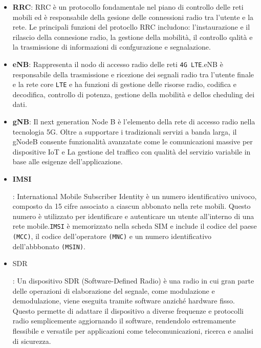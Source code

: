 \documentclass[english]{article}
\begin{document}
\begin{itemize}
	\item \textbf{\hypertarget{RRC}{RRC}}: RRC è un protocollo fondamentale
	      nel piano di controllo delle reti mobili ed è responsabile della gesione delle
	      connessioni radio tra l'utente e la rete. Le principali funzioni
	      del protocllo RRC includono: l'instaurazione e il rilascio della connesione radio,
	      la gestione della mobilità, il controllo qalità  e la trasmissione di informazioni
	      di confgurazione e segnalazione.

	\item \textbf{eNB}\hypertarget{eNB}{}: Rappresenta il  nodo di accesso radio delle reti
	      \texttt{4G LTE}.\@ eNB è responsabile della trasmissione e ricezione dei segnali radio
	      tra l'utente finale e la rete core \texttt{LTE} e ha funzioni di gestione delle risorse radio,
	      codifica e decodifica, controllo di potenza, gestione della mobilità e dellos cheduling dei dati.

	\item \textbf{gNB}\hypertarget{gNB}{}: Il next generation Node B è l'elemento
	      della rete di accesso radio nella tecnologia 5G.
	      Oltre a supportare i tradizionali servizi a banda larga, il gNodeB consente
	      funzionalità avanzatate come le comunicazioni massive per dispositive IoT e La
	      gestione del traffico con qualità del servizio variabile in base alle
	      esigenze dell'applicazione.

	\item \hypertarget{IMSI}{\textbf{IMSI}}: International Mobile Subscriber Identity
	      è un numero identificativo univoco,
	      composto da 15 cifre associato a ciascun abbonato nella rete mobili.
	      Questo numero è utilizzato per identificare e autenticare un utente all'interno
	      di una rete mobile.\@ \texttt{IMSI} è memorizzato nella scheda SIM e include il
	      codice del paese \texttt{(MCC)},
	      il codice dell'operatore \texttt{(MNC)}
	      e un numero identificativo dell'abbbonato \texttt{(MSIN)}.

	\item \hypertarget{SDR}{SDR}: Un dispositivo SDR (Software-Defined Radio)
	      è una radio in cui gran parte delle operazioni di elaborazione del segnale,
	      come modulazione e demodulazione, viene eseguita tramite software anziché hardware fisso.
	      Questo permette di adattare il dispositivo a diverse frequenze e protocolli radio
	      semplicemente aggiornando il software, rendendolo estremamente flessibile e versatile
	      per applicazioni come telecomunicazioni, ricerca e analisi di sicurezza.


\end{itemize}
\end{document}
